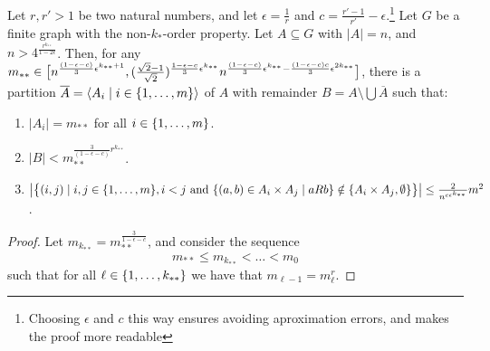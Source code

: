         \begin{theorem} \label{thm:existance_of_equitative_partition_with_perfect_pairs_but_with_bound_exceptional_pairs}
            Let $r, r' > 1$ be two natural numbers,
            and let $\epsilon = \frac{1}{r}$ and \mbox{$c = \frac{r' - 1}{r'} - \epsilon$}.\footnote{Choosing $\epsilon$ and
                $c$ this way ensures avoiding aproximation errors, and makes the proof more readable}
            Let $G$ be a finite graph with the non-$k_*$-order property.
            Let $A \subseteq G$ with $|A| = n$, and $n > 4^{\frac{r^{k_{**}}}{1-2\epsilon}}$.
            Then, for any $m_{**} \in \bigl[ n^{\frac{(1-\epsilon-c)}{3}\epsilon^{k_{**}+1}},
            ( \frac{\sqrt{2}-1}{\sqrt{2}} )^{\frac{1-\epsilon-c}{3}\epsilon^{k_{**}}} n^{\frac{(1-\epsilon-c)}{3}\epsilon^{k_{**}} -
            \frac{(1-\epsilon-c)c}{3}\epsilon^{2k_{**}}} \bigr]$, there is a partition
            $\overline{A} = \left< A_i \mid i \in \{ 1, \dots, m \} \right>$ of $A$ with remainder
            $B = A \setminus \bigcup \overline{A}$ such that:
            \begin{enumerate}[label={\Roman*}., ref={\Roman*}, font=\rmfamily]
                \item\label{itm:existance_of_equitative_partition_with_perfect_pairs_but_with_bound_exceptional_pairs.1}
                    $|A_i| = m_{**}$ for all $i \in \{ 1, \dots, m \}$.
                \item\label{itm:existance_of_equitative_partition_with_perfect_pairs_but_with_bound_exceptional_pairs.2}
                    $|B| < m_{**}^{\frac{3}{(1-\epsilon-c)}r^{k_{**}}}$.
                \item\label{itm:existance_of_equitative_partition_with_perfect_pairs_but_with_bound_exceptional_pairs.3}
                    $\bigl| \bigl\{  (i,j) \mid i,j \in \{ 1, \dots, m \}, i < j \text{ and }
                    \{ (a,b) \in A_i \times A_j \mid a R b \} \notin
                    \{ A_i \times A_j, \emptyset \} \bigr\} \bigr|
                    \leq \frac{2}{n^{c\epsilon^{k_{**}}}} m^2$.
            \end{enumerate}
            \begin{proof}
                Let $m_{k_{**}} = m_{**}^{\frac{3}{1-\epsilon-c}}$, and consider the sequence
                \[
                    m_{**} \leq m_{k_{**}} < \dots < m_0
                \]
                such that for all $\ell \in \{ 1, \dots, k_{**} \}$ we have that $m_{\ell-1} = m_\ell^r$.

\end{proof}
\end{theorem}
